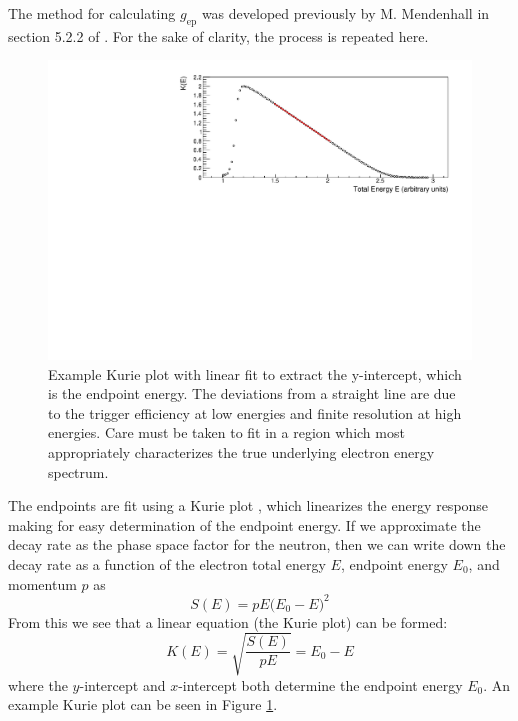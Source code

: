 The method for calculating $g_{\mathrm{ep}}$ was developed previously by M. Mendenhall in section
5.2.2 of \cite{mpmThesis}. For the sake of clarity, the process is repeated here.

\begin{figure}
  \centering
  \includegraphics[scale=0.75]{3-UCNAAnalysis/kuriePlot.pdf}
  \caption{Example Kurie plot with linear fit to extract the y-intercept, which is
    the endpoint energy. The deviations from a straight line are due to the
    trigger efficiency at low energies and finite resolution at high energies. Care
    must be taken to fit in a region which most appropriately characterizes the true
    underlying electron energy spectrum.}
  \label{fig:kuriePlot}
\end{figure}
  

The endpoints are fit using a Kurie plot \cite{kurie1936radiations}, which linearizes the
energy response making for easy determination of the endpoint energy. If we approximate
the decay rate as the phase space factor for the neutron, then we can write down
the decay rate as a function of the electron total energy $E$, endpoint
energy $E_0$, and momentum $p$ as
%
\begin{equation}
  S(E) = pE\big(E_0-E\big)^2
\end{equation}
%
From this we see that a linear equation (the Kurie plot) can be formed:
%
\begin{equation}
  K(E) = \sqrt{\frac{S(E)}{pE}} = E_0-E
\end{equation}
%
where the $y$-intercept and $x$-intercept both determine the endpoint energy $E_0$.
An example Kurie plot can be seen in Figure \ref{fig:kuriePlot}.

